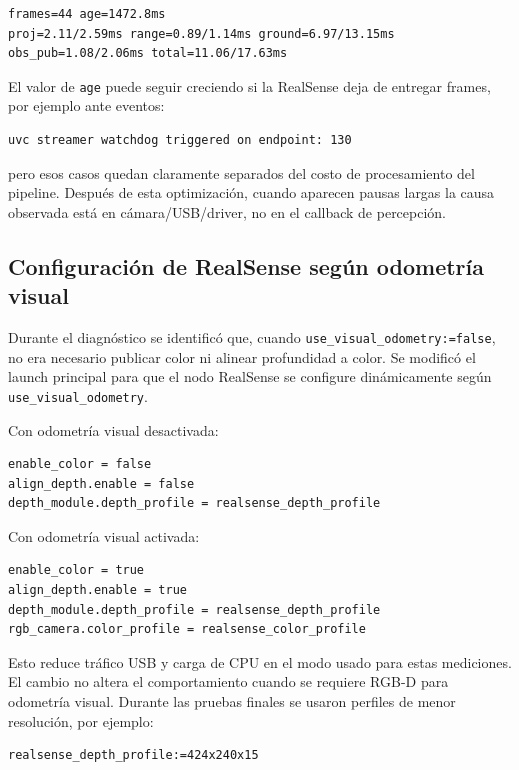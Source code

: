 \begin{verbatim}
frames=44 age=1472.8ms
proj=2.11/2.59ms range=0.89/1.14ms ground=6.97/13.15ms
obs_pub=1.08/2.06ms total=11.06/17.63ms
\end{verbatim}

El valor de \texttt{age} puede seguir creciendo si la RealSense deja de
entregar frames, por ejemplo ante eventos:

\begin{verbatim}
uvc streamer watchdog triggered on endpoint: 130
\end{verbatim}

pero esos casos quedan claramente separados del costo de procesamiento del
pipeline. Después de esta optimización, cuando aparecen pausas largas la causa
observada está en cámara/USB/driver, no en el callback de percepción.

\subsection{Configuración de RealSense según odometría visual}
\label{subsec:perf-realsense-config}

Durante el diagnóstico se identificó que, cuando
\texttt{use\_visual\_odometry:=false}, no era necesario publicar color ni
alinear profundidad a color. Se modificó el launch principal para que el nodo
RealSense se configure dinámicamente según \texttt{use\_visual\_odometry}.

Con odometría visual desactivada:

\begin{verbatim}
enable_color = false
align_depth.enable = false
depth_module.depth_profile = realsense_depth_profile
\end{verbatim}

Con odometría visual activada:

\begin{verbatim}
enable_color = true
align_depth.enable = true
depth_module.depth_profile = realsense_depth_profile
rgb_camera.color_profile = realsense_color_profile
\end{verbatim}

Esto reduce tráfico USB y carga de CPU en el modo usado para estas mediciones.
El cambio no altera el comportamiento cuando se requiere RGB-D para odometría
visual. Durante las pruebas finales se usaron perfiles de menor resolución,
por ejemplo:

\begin{verbatim}
realsense_depth_profile:=424x240x15
\end{verbatim}

